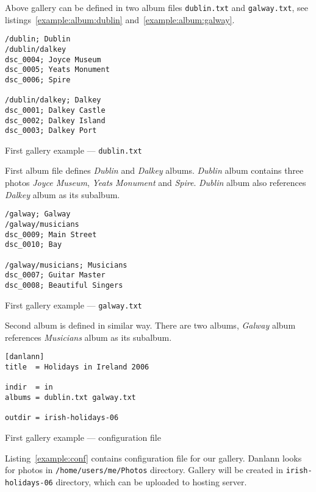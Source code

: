 \documentclass{article}
\begin{document}
Above gallery can be defined in two album files \texttt{dublin.txt} and
\texttt{galway.txt}, see listings~\ref{example:album:dublin}
and~\ref{example:album:galway}.

\begin{listing}
\begin{lstlisting}
/dublin; Dublin
/dublin/dalkey
dsc_0004; Joyce Museum
dsc_0005; Yeats Monument
dsc_0006; Spire

/dublin/dalkey; Dalkey
dsc_0001; Dalkey Castle
dsc_0002; Dalkey Island
dsc_0003; Dalkey Port
\end{lstlisting}
\caption{First gallery example --- \texttt{dublin.txt}}\label{example:album:dublin}
\end{listing}

First album file defines \textit{Dublin} and \textit{Dalkey} albums.
\textit{Dublin} album contains three photos \textit{Joyce Museum},
\textit{Yeats Monument} and \textit{Spire}. \textit{Dublin} album
also references \textit{Dalkey} album as its subalbum.

\begin{listing}
\begin{lstlisting}
/galway; Galway
/galway/musicians
dsc_0009; Main Street
dsc_0010; Bay

/galway/musicians; Musicians
dsc_0007; Guitar Master
dsc_0008; Beautiful Singers
\end{lstlisting}
\caption{First gallery example --- \texttt{galway.txt}}\label{example:album:galway}
\end{listing}

Second album is defined in similar way. There are two albums, \textit{Galway} album references
\textit{Musicians} album as its subalbum.

\begin{listing}
\begin{lstlisting}
[danlann]
title  = Holidays in Ireland 2006

indir  = in
albums = dublin.txt galway.txt

outdir = irish-holidays-06
\end{lstlisting}
\caption{First gallery example --- configuration file}\label{example:conf}
\end{listing}

Listing~\ref{example:conf} contains configuration file for our gallery.
Danlann looks for photos in \texttt{/home/users/me/Photos} directory.
Gallery will be created in \texttt{irish-holidays-06} directory, which
can be uploaded to hosting server.
\end{document}
